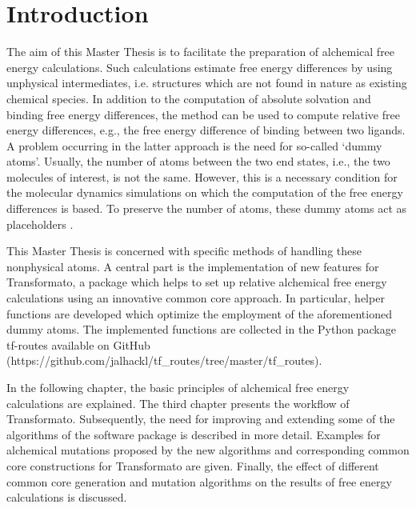 \chapter{Introduction}

The aim of this Master Thesis is to facilitate the preparation of
alchemical free energy calculations. Such calculations
estimate free energy differences by using unphysical intermediates, i.e. structures
which are not found in nature as existing chemical species. In addition
to the computation of absolute solvation and binding free energy differences,
the method can be used to compute relative free energy differences, e.g.,
the free energy difference of binding between two ligands. A problem occurring
in the latter approach is the need for so-called \textquoteleft dummy
atoms\textquoteright . Usually, the number of atoms between the two
end states, i.e., the two molecules of interest, is not the same.
However, this is a necessary condition for the molecular dynamics
simulations on which the computation of the free energy differences
is based. To preserve the number of atoms, these dummy atoms act as
placeholders\cite{Fleck.2021} \cite{Karwounopoulos.2022}.

This Master Thesis is concerned with specific methods of handling these nonphysical
atoms. A central part is the implementation of new features
for Transformato, a package which helps to set up relative alchemical
free energy calculations using an innovative common core approach\cite{key-2}\cite{Wieder.2022}.
In particular, helper functions are developed which optimize the employment of
the aforementioned dummy atoms. 
The implemented functions are collected in the  Python package tf-routes available on GitHub (https://github.com/jalhackl/tf\_routes/tree/master/tf\_routes).

In the following chapter, the basic principles of alchemical free energy
calculations are explained. The third chapter presents the workflow
of Transformato. Subsequently, the need for improving and extending some of the algorithms of the software
package is described in more detail. Examples for alchemical mutations
proposed by the new algorithms and corresponding common core constructions
for Transformato are given. Finally, the effect of different common core generation and mutation
algorithms on the results of free energy calculations is discussed.